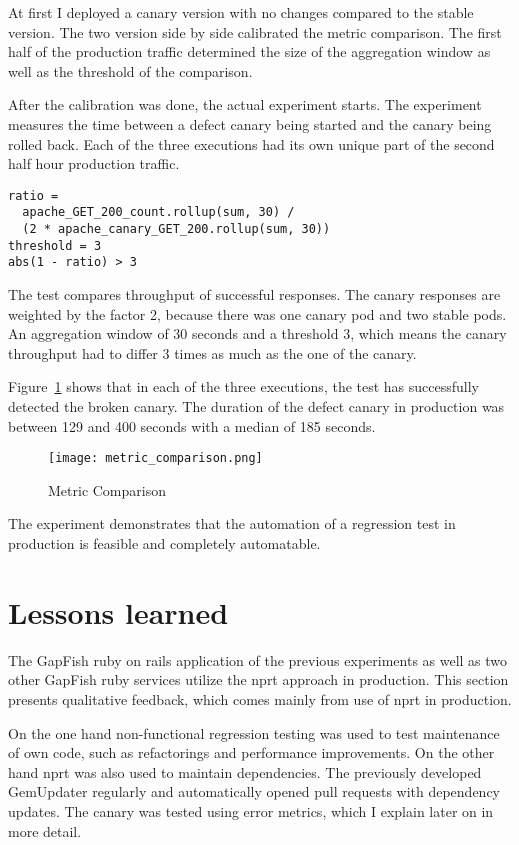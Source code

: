 At first I deployed a canary version with no changes compared to the stable version. The
two version side by side calibrated the metric comparison. The first half of the
production traffic determined the size of the aggregation window as well as the threshold
of the comparison.

After the calibration was done, the actual experiment starts. The experiment measures the
time between a defect canary being started and the canary being rolled back. Each
of the three executions had its own unique part of the second half hour production traffic.

\begin{verbatim}
ratio =
  apache_GET_200_count.rollup(sum, 30) /
  (2 * apache_canary_GET_200.rollup(sum, 30))
threshold = 3
abs(1 - ratio) > 3
\end{verbatim}

The test compares throughput of successful responses. The canary responses are weighted by
the factor 2, because there was one canary pod and two stable pods. An aggregation window
of 30 seconds and a threshold 3, which means the canary throughput had to differ 3 times
as much as the one of the canary.

Figure~\ref{fig:metric_comparison} shows that in each of the three executions, the test
has successfully detected the broken canary. The duration of the defect canary in
production was between 129 and 400 seconds with a median of 185 seconds.

\begin{figure}[htbp]
  \centering
  \texttt{[image: metric\_comparison.png]}
  \caption[Metric Comparison]{Metric Comparison}
  \label{fig:metric_comparison}
\end{figure}

The experiment demonstrates that the automation of a regression test in production is
feasible and completely automatable.

\section{Lessons learned}

The GapFish ruby on rails application of the previous experiments as well as two other
GapFish ruby services utilize the \gls{nprt} approach in production. This section presents
qualitative feedback, which comes mainly from use of \gls{nprt} in production.

On the one hand non-functional regression testing was used to test maintenance of own code,
such as refactorings and performance improvements. On the other hand \gls{nprt} was also
used to maintain dependencies. The previously developed GemUpdater regularly and
automatically opened pull requests with dependency updates. The canary was tested using
error metrics, which I explain later on in more detail.

